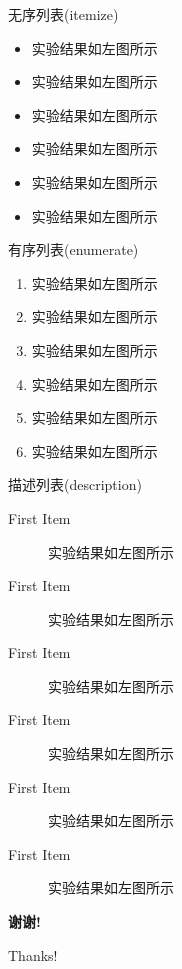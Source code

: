 \documentclass[8pt,compress,t,notheorems,noamsthm,notheorem,xcolor=x11names]{beamer}
\theoremstyle{nonumberplain}%
\theoremstyle{plain}
\begin{document}

\begin{frame}{无序列表(itemize)}
	\begin{itemize}
		\item 实验结果如左图所示
		\item 实验结果如左图所示
		\item 实验结果如左图所示
		\item 实验结果如左图所示
		\item 实验结果如左图所示
		\item 实验结果如左图所示
	\end{itemize}
\end{frame}

\begin{frame}{有序列表(enumerate)}
\begin{enumerate}
	\item 实验结果如左图所示
	\item 实验结果如左图所示
	\item 实验结果如左图所示
	\item 实验结果如左图所示
	\item 实验结果如左图所示
	\item 实验结果如左图所示
\end{enumerate}
\end{frame}

\begin{frame}{描述列表(description)}
\begin{description}
	\item[First Item] 实验结果如左图所示
	\item[First Item] 实验结果如左图所示
	\item[First Item] 实验结果如左图所示
	\item[First Item] 实验结果如左图所示
	\item[First Item] 实验结果如左图所示
	\item[First Item] 实验结果如左图所示
\end{description}
\end{frame}

\begin{frame}[c,plain]
\begin{center}
\Huge\color{red}\heiti\bfseries 谢\quad 谢!

  Thanks!
\end{center}
\end{frame}
\end{document}
